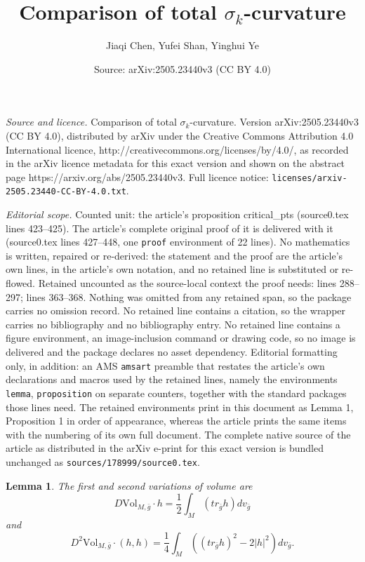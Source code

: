 \documentclass[10pt,a4paper]{amsart}
\title{Comparison of total $\sigma_k$-curvature}
\author{Jiaqi Chen, Yufei Shan, Yinghui Ye}
\date{Source: arXiv:2505.23440v3 (CC BY 4.0)}
\newtheorem{lemma}{Lemma}
\newcommand{\bg}{\bar{g}}
\begin{document}
\maketitle

\noindent\emph{Source and licence.} Comparison of total $\sigma_k$-curvature. Version arXiv:2505.23440v3 (CC BY 4.0), distributed by arXiv under the Creative Commons Attribution 4.0 International licence, http://creativecommons.org/licenses/by/4.0/, as recorded in the arXiv licence metadata for this exact version and shown on the abstract page https://arxiv.org/abs/2505.23440v3. Full licence notice: \texttt{licenses/arxiv-2505.23440-CC-BY-4.0.txt}.\par\smallskip

\noindent\textit{Editorial scope.} Counted unit: the article's proposition critical\_pts (source0.tex lines 423--425). The article's complete original proof of it is delivered with it (source0.tex lines 427--448, one \texttt{proof} environment of 22 lines). No mathematics is written, repaired or re-derived: the statement and the proof are the article's own lines, in the article's own notation, and no retained line is substituted or re-flowed.  Retained uncounted as the source-local context the proof needs: lines 288--297; lines 363--368.  Nothing was omitted from any retained span, so the package carries no omission record.  No retained line contains a citation, so the wrapper carries no bibliography and no bibliography entry.  No retained line contains a figure environment, an image-inclusion command or drawing code, so no image is delivered and the package declares no asset dependency.  Editorial formatting only, in addition: an AMS \texttt{amsart} preamble that restates the article's own declarations and macros used by the retained lines, namely the environments \texttt{lemma}, \texttt{proposition} on separate counters, together with the standard packages those lines need.  The retained environments print in this document as Lemma 1, Proposition 1 in order of appearance, whereas the article prints the same items with the numbering of its own full document.  The complete native source of the article as distributed in the arXiv e-print for this exact version is bundled unchanged as \texttt{sources/178999/source0.tex}.
\begin{lemma}\label{Lemma: variation_of_volume}
    The first and second variations of volume are
    \begin{equation*}
        D \mathrm{Vol}_{M,\bg} \cdot h=\frac{1}{2}\int_M \left( tr_{\bg} h \right) dv_{\bg}
    \end{equation*}
    and
    \begin{equation*}
        D^2 \mathrm{Vol}_{M,\bg} \cdot (h,h) = \frac{1}{4} \int_M \left( \left( tr_{\bg}h \right)^2-2|h|^2 \right) dv_{\bg}.
    \end{equation*}
\end{lemma}
\end{document}
